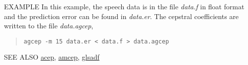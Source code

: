 \begin{options}
\end{options}

\begin{qsection}{EXAMPLE}
        In this example, the speech data is in the file {\em data.f}
        in float format and the prediction error can be found in {\em data.er}.
        The cepstral coefficients are written to
        the file {\em data.agcep},
\begin{quote}
 \verb!agcep -m 15 data.er < data.f > data.agcep!
\end{quote} 
\end{qsection}

\begin{qsection}{SEE ALSO}
\hyperlink{acep}{acep},
\hyperlink{amcep}{amcep},
\hyperlink{glsadf}{glsadf}
\end{qsection}
